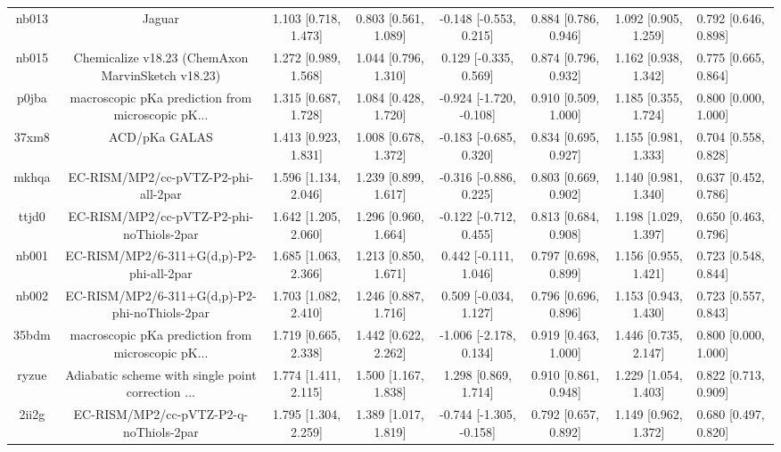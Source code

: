 \documentclass{article}
\begin{document}
\begin{center}
\begin{longtable}{|ccccccc|}
 nb013 &                                             Jaguar &  1.103 [0.718, 1.473] &  0.803 [0.561, 1.089] &   -0.148 [-0.553, 0.215] &  0.884 [0.786, 0.946] &   1.092 [0.905, 1.259] &   0.792 [0.646, 0.898] \\
 nb015 &  Chemicalize v18.23 (ChemAxon MarvinSketch v18.23) &  1.272 [0.989, 1.568] &  1.044 [0.796, 1.310] &    0.129 [-0.335, 0.569] &  0.874 [0.796, 0.932] &   1.162 [0.938, 1.342] &   0.775 [0.665, 0.864] \\
 p0jba &  macroscopic pKa prediction from microscopic pK... &  1.315 [0.687, 1.728] &  1.084 [0.428, 1.720] &  -0.924 [-1.720, -0.108] &  0.910 [0.509, 1.000] &   1.185 [0.355, 1.724] &   0.800 [0.000, 1.000] \\
 37xm8 &                                      ACD/pKa GALAS &  1.413 [0.923, 1.831] &  1.008 [0.678, 1.372] &   -0.183 [-0.685, 0.320] &  0.834 [0.695, 0.927] &   1.155 [0.981, 1.333] &   0.704 [0.558, 0.828] \\
 mkhqa &                EC-RISM/MP2/cc-pVTZ-P2-phi-all-2par &  1.596 [1.134, 2.046] &  1.239 [0.899, 1.617] &   -0.316 [-0.886, 0.225] &  0.803 [0.669, 0.902] &   1.140 [0.981, 1.340] &   0.637 [0.452, 0.786] \\
 ttjd0 &           EC-RISM/MP2/cc-pVTZ-P2-phi-noThiols-2par &  1.642 [1.205, 2.060] &  1.296 [0.960, 1.664] &   -0.122 [-0.712, 0.455] &  0.813 [0.684, 0.908] &   1.198 [1.029, 1.397] &   0.650 [0.463, 0.796] \\
 nb001 &           EC-RISM/MP2/6-311+G(d,p)-P2-phi-all-2par &  1.685 [1.063, 2.366] &  1.213 [0.850, 1.671] &    0.442 [-0.111, 1.046] &  0.797 [0.698, 0.899] &   1.156 [0.955, 1.421] &   0.723 [0.548, 0.844] \\
 nb002 &      EC-RISM/MP2/6-311+G(d,p)-P2-phi-noThiols-2par &  1.703 [1.082, 2.410] &  1.246 [0.887, 1.716] &    0.509 [-0.034, 1.127] &  0.796 [0.696, 0.896] &   1.153 [0.943, 1.430] &   0.723 [0.557, 0.843] \\
 35bdm &  macroscopic pKa prediction from microscopic pK... &  1.719 [0.665, 2.338] &  1.442 [0.622, 2.262] &   -1.006 [-2.178, 0.134] &  0.919 [0.463, 1.000] &   1.446 [0.735, 2.147] &   0.800 [0.000, 1.000] \\
 ryzue &  Adiabatic scheme with single point correction ... &  1.774 [1.411, 2.115] &  1.500 [1.167, 1.838] &     1.298 [0.869, 1.714] &  0.910 [0.861, 0.948] &   1.229 [1.054, 1.403] &   0.822 [0.713, 0.909] \\
 2ii2g &             EC-RISM/MP2/cc-pVTZ-P2-q-noThiols-2par &  1.795 [1.304, 2.259] &  1.389 [1.017, 1.819] &  -0.744 [-1.305, -0.158] &  0.792 [0.657, 0.892] &   1.149 [0.962, 1.372] &   0.680 [0.497, 0.820] \\

\end{longtable}
\end{center}
\end{document}
